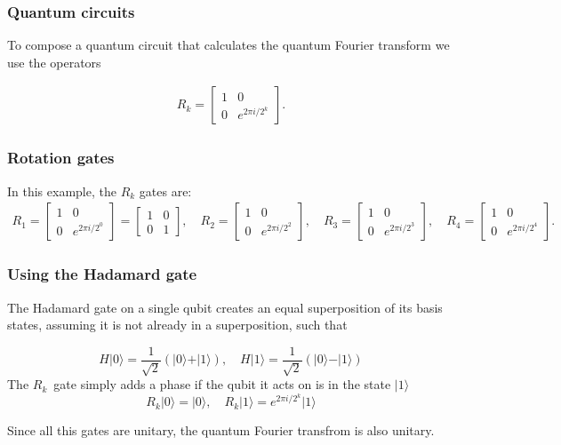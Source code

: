 \documentclass{beamer}
\begin{document}
\begin{frame}
\frametitle{Quantum circuits}

To compose a quantum circuit that calculates the quantum Fourier
transform we use the operators

\begin{align*}
R_k = 
\begin{bmatrix}
1 & 0 \\
0 & e^{2\pi i/2^k}
\end{bmatrix}.
\end{align*}
\end{frame}

\begin{frame}
\frametitle{Rotation gates}

In this example, the \(R_k\) gates are:
\begin{align*}
R_1 = \begin{bmatrix}
1 & 0 \\
0 & e^{2 \pi i /2^0}
\end{bmatrix} = 
\begin{bmatrix}
1 & 0 \\
0 & 1
\end{bmatrix}, \quad 
R_2 = \begin{bmatrix}
1 & 0 \\
0 & e^{2 \pi i /2^2}
\end{bmatrix}, \quad 
R_3 = \begin{bmatrix}
1 & 0 \\
0 & e^{2 \pi i /2^3}
\end{bmatrix}, \quad 
R_4 = \begin{bmatrix}
1 & 0 \\
0 & e^{2 \pi i /2^4}
\end{bmatrix}.
\end{align*}
\end{frame}

\begin{frame}
\frametitle{Using the Hadamard gate}

The Hadamard
gate on a single qubit creates an equal superposition of its basis
states, assuming it is not already in a superposition, such that

\[
H\vert 0 \rangle = \frac{1}{\sqrt{2}} \left(\vert 0 \rangle + \vert 1\rangle\right), \quad H\vert 1\rangle = \frac{1}{\sqrt{2}} \left(\vert 0 \rangle - \vert 1\rangle\right)
\]
The $R_k$ gate simply adds a phase if the qubit it acts on is in the state $\vert 1\rangle$
\[
    R_k\vert 0 \rangle = \vert 0 \rangle, \quad R_k\vert 1\rangle = e^{2\pi i/2^{k}}\vert 1\rangle
\]

Since all this gates are unitary, the quantum Fourier transfrom is also unitary.
\end{frame}
\end{document}
